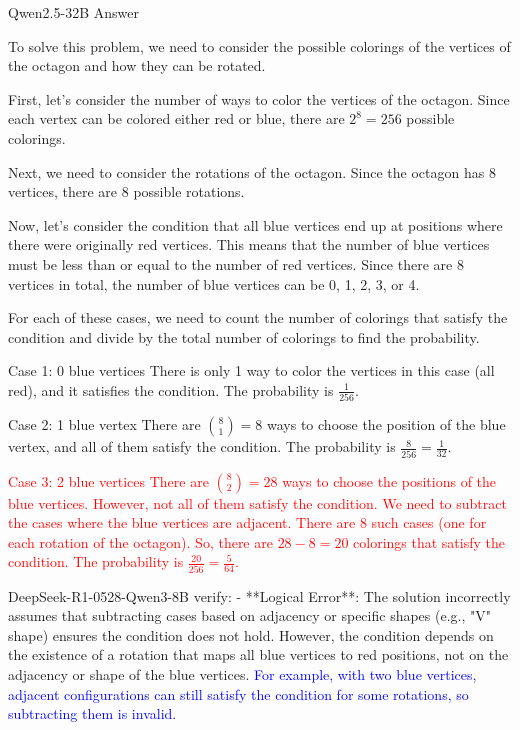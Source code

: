 
\begin{answerbox}{Qwen2.5-32B Answer}

To solve this problem, we need to consider the possible colorings of the vertices of the octagon and how they can be rotated.

First, let's consider the number of ways to color the vertices of the octagon. Since each vertex can be colored either red or blue, there are $2^8 = 256$ possible colorings.

Next, we need to consider the rotations of the octagon. Since the octagon has 8 vertices, there are 8 possible rotations.

Now, let's consider the condition that all blue vertices end up at positions where there were originally red vertices. This means that the number of blue vertices must be less than or equal to the number of red vertices. Since there are 8 vertices in total, the number of blue vertices can be 0, 1, 2, 3, or 4.

For each of these cases, we need to count the number of colorings that satisfy the condition and divide by the total number of colorings to find the probability.

Case 1: 0 blue vertices
There is only 1 way to color the vertices in this case (all red), and it satisfies the condition. The probability is $\frac{1}{256}$.

Case 2: 1 blue vertex
There are $\binom{8}{1} = 8$ ways to choose the position of the blue vertex, and all of them satisfy the condition. The probability is $\frac{8}{256} = \frac{1}{32}$.


\textcolor{red}{Case 3: 2 blue vertices
There are $\binom{8}{2} = 28$ ways to choose the positions of the blue vertices. However, not all of them satisfy the condition. We need to subtract the cases where the blue vertices are adjacent. There are 8 such cases (one for each rotation of the octagon). So, there are $28 - 8 = 20$ colorings that satisfy the condition. The probability is $\frac{20}{256} = \frac{5}{64}$.}

\begin{tcolorbox}[
    colback=blue!5!white,         %
    colframe=blue!40!white,       %
]
DeepSeek-R1-0528-Qwen3-8B verify: - **Logical Error**: The solution incorrectly assumes that subtracting cases based on adjacency or specific shapes (e.g., "V" shape) ensures the condition does not hold. However, the condition depends on the existence of a rotation that maps all blue vertices to red positions, not on the adjacency or shape of the blue vertices. \textcolor{blue}{For example, with two blue vertices, adjacent configurations can still satisfy the condition for some rotations, so subtracting them is invalid.}
\end{tcolorbox}


\end{answerbox}
